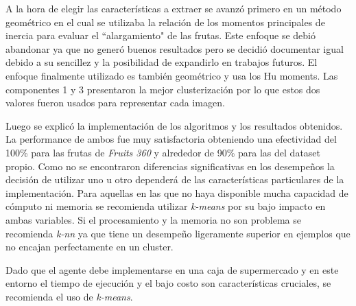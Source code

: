 \documentclass[10pt, a4paper]{article}
\begin{document}
A la hora de elegir las características a extraer se avanzó primero en un método geométrico en el cual se utilizaba la relación de los momentos principales de inercia para evaluar el ``alargamiento" de las frutas. Este enfoque se debió abandonar ya que no generó buenos resultados pero se decidió documentar igual debido a su sencillez y la posibilidad de expandirlo en trabajos futuros. El enfoque finalmente utilizado es también geométrico y usa los Hu moments. Las componentes 1 y 3 presentaron la mejor clusterización por lo que estos dos valores fueron usados para representar cada imagen. 

Luego se explicó la implementación de los algoritmos y los resultados obtenidos. La performance de ambos fue muy satisfactoria obteniendo una efectividad del 100\% para las frutas de \textit{Fruits 360} y alrededor de 90\% para las del dataset propio. Como no se encontraron diferencias significativas en los desempeños la decisión de utilizar uno u otro dependerá de las características particulares de la implementación. Para aquellas en las que no haya disponible mucha capacidad de cómputo ni memoria se recomienda utilizar \textit{k-means} por su bajo impacto en ambas variables. Si el procesamiento y la memoria no son problema se recomienda \textit{k-nn} ya que tiene un desempeño ligeramente superior en ejemplos que no encajan perfectamente en un cluster.

Dado que el agente debe implementarse en una caja de supermercado y en este entorno el tiempo de ejecución y el bajo costo son características cruciales, se recomienda el uso de \textit{k-means}.

\printbibliography
\end{document}

